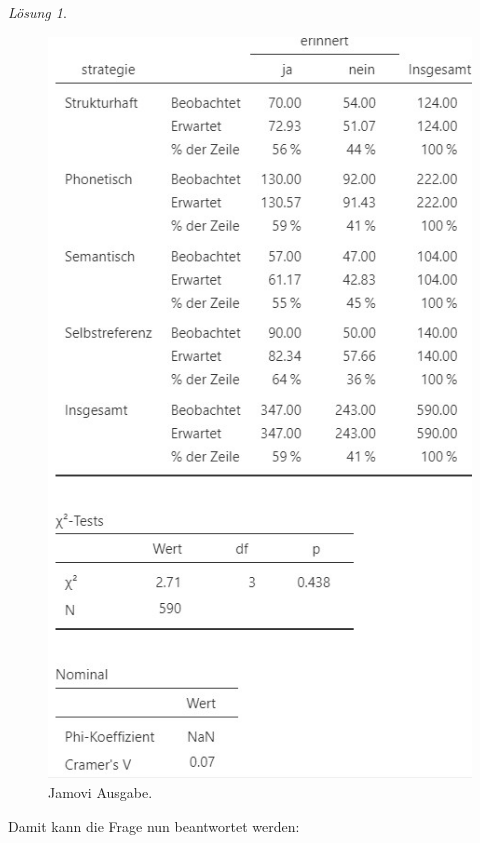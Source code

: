 \documentclass[
]{book}
\theoremstyle{definition}
\theoremstyle{definition}
\theoremstyle{definition}
\theoremstyle{definition}
\theoremstyle{remark}
\newtheorem*{solution}{Lösung}
\begin{document}
\begin{solution}
\begin{figure}
{\centering \includegraphics{figures/10-exr-memory-strategy-jmv-output} 

}

\caption{Jamovi Ausgabe.}\label{fig:sol-memory-strategy-output}
\end{figure}

Damit kann die Frage nun beantwortet werden:


\end{solution}
\end{document}
